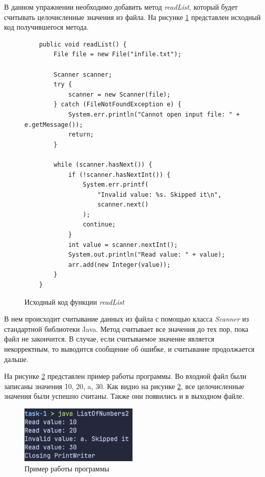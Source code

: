 \documentclass[a4paper, 14pt]{extarticle}
\begin{document}
В данном упражнении необходимо добавить метод \textit{readList}, который будет
считывать целочисленные значения из файла. На рисунке \ref{fig:task-1-1}
представлен исходный код получившегося метода.

\begin{figure}[H]
  \begin{verbatim}
    public void readList() {
        File file = new File("infile.txt");

        Scanner scanner;
        try {
            scanner = new Scanner(file);
        } catch (FileNotFoundException e) {
            System.err.println("Cannot open input file: " + e.getMessage());
            return;
        }

        while (scanner.hasNext()) {
            if (!scanner.hasNextInt()) {
                System.err.printf(
                    "Invalid value: %s. Skipped it\n",
                    scanner.next()
                );
                continue;
            }
            int value = scanner.nextInt();
            System.out.println("Read value: " + value);
            arr.add(new Integer(value));
        }
    }
  \end{verbatim}
  \caption{Исходный код функции \textit{readList}}
  \label{fig:task-1-1}
\end{figure}

В нем происходит считывание данных из файла с помощью класса \textit{Scanner} из
стандартной библиотеки Java. Метод считывает все значения до тех пор, пока
файл не закончится. В случае, если считываемое значение является некорректным,
то выводится сообщение об ошибке, и считывание продолжается дальше.

На рисунке \ref{fig:task-1-2} представлен пример работы программы. Во входной
файл были записаны значения 10, 20, a, 30. Как видно на рисунке
\ref{fig:task-1-2}, все целочисленные значения были успешно считаны. Также они
появились и в выходном файле.

\begin{figure}[H]
  \centering
  \includegraphics[width=0.5\textwidth]{images/task-1.png}
  \caption{Пример работы программы}
  \label{fig:task-1-2}
\end{figure}
\end{document}

